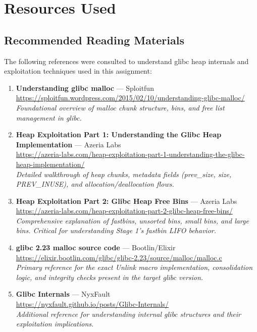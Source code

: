 \documentclass[12pt,a4paper]{article}
\begin{document}
\newpage
\section{Resources Used}

\subsection{Recommended Reading Materials}

The following references were consulted to understand glibc heap internals
and exploitation techniques used in this assignment:

\begin{enumerate}
  \item \textbf{Understanding glibc malloc} — Sploitfun\\
        \url{https://sploitfun.wordpress.com/2015/02/10/understanding-glibc-malloc/}\\
        \textit{Foundational overview of malloc chunk structure, bins, and free
        list management in glibc.}

  \item \textbf{Heap Exploitation Part 1: Understanding the Glibc Heap
        Implementation} — Azeria Labs\\
        \url{https://azeria-labs.com/heap-exploitation-part-1-understanding-the-glibc-heap-implementation/}\\
        \textit{Detailed walkthrough of heap chunks, metadata fields
        (prev\_size, size, PREV\_INUSE), and allocation/deallocation flows.}

  \item \textbf{Heap Exploitation Part 2: Glibc Heap Free Bins} — Azeria Labs\\
        \url{https://azeria-labs.com/heap-exploitation-part-2-glibc-heap-free-bins/}\\
        \textit{Comprehensive explanation of fastbins, unsorted bins, small bins,
        and large bins. Critical for understanding Stage 1's fastbin LIFO behavior.}

  \item \textbf{glibc 2.23 malloc source code} — Bootlin/Elixir\\
        \url{https://elixir.bootlin.com/glibc/glibc-2.23/source/malloc/malloc.c}\\
        \textit{Primary reference for the exact Unlink macro implementation,
        consolidation logic, and integrity checks present in the target
        glibc version.}

  \item \textbf{Glibc Internals} — NyxFault\\
        \url{https://nyxfault.github.io/posts/Glibc-Internals/}\\
        \textit{Additional reference for understanding internal glibc structures
        and their exploitation implications.}
\end{enumerate}
\end{document}
